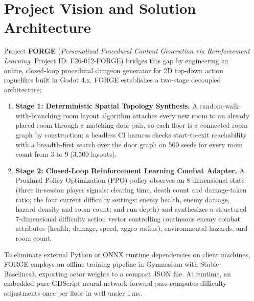 \section*{Project Vision and Solution Architecture}
Project \textbf{FORGE} (\textit{Personalized Procedural Content Generation via Reinforcement Learning}, Project ID: F26-012-FORGE) bridges this gap by engineering an online, closed-loop procedural dungeon generator for 2D top-down action roguelikes built in Godot 4.x. FORGE establishes a two-stage decoupled architecture:
\begin{enumerate}
    \item \textbf{Stage 1: Deterministic Spatial Topology Synthesis.} A random-walk-with-branching room layout algorithm attaches every new room to an already placed room through a matching door pair, so each floor is a connected room graph by construction; a headless CI harness checks start-to-exit reachability with a breadth-first search over the door graph on 500 seeds for every room count from 3 to 9 (3,500 layouts).
    \item \textbf{Stage 2: Closed-Loop Reinforcement Learning Combat Adapter.} A Proximal Policy Optimization (PPO) policy observes an 8-dimensional state (three in-session player signals: clearing time, death count and damage-taken ratio; the four current difficulty settings: enemy health, enemy damage, hazard density and room count; and run depth) and synthesizes a structured 7-dimensional difficulty action vector controlling continuous enemy combat attributes (health, damage, speed, aggro radius), environmental hazards, and room count.
\end{enumerate}
To eliminate external Python or ONNX runtime dependencies on client machines, FORGE employs an offline training pipeline in Gymnasium with Stable-Baselines3, exporting actor weights to a compact JSON file. At runtime, an embedded pure-GDScript neural network forward pass computes difficulty adjustments once per floor in well under 1\,ms.


